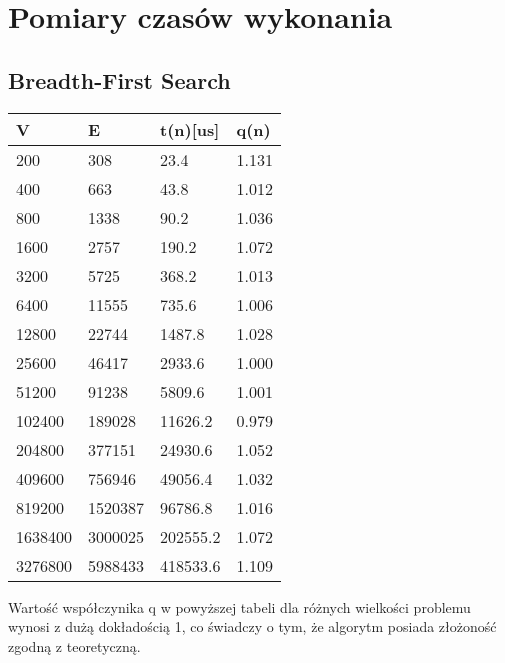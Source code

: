 \documentclass[11pt,a4paper]{article}
\begin{document}
\section{Pomiary czasów wykonania}
\subsection{Breadth-First Search}
\begin{longtable}{| m{1.7cm}| m{1.7cm} | m{1.7cm} | m{1.2cm} |}
\hline
V    &      E    &      t(n)[us] &  q(n)  \\ \hline
200  &      308  &      23.4  &     1.131 \\ \hline
400  &      663  &      43.8  &     1.012 \\ \hline
800  &      1338  &     90.2  &     1.036 \\ \hline
1600  &     2757  &     190.2  &    1.072 \\ \hline
3200  &     5725  &     368.2  &    1.013 \\ \hline
6400  &     11555  &    735.6  &    1.006 \\ \hline
12800  &    22744  &    1487.8  &   1.028 \\ \hline
25600  &    46417  &    2933.6  &   1.000 \\ \hline
51200  &    91238  &    5809.6  &   1.001 \\ \hline
102400  &   189028  &   11626.2  &  0.979 \\ \hline
204800  &   377151  &   24930.6  &  1.052 \\ \hline
409600  &   756946  &   49056.4  &  1.032 \\ \hline
819200  &   1520387  &  96786.8  &  1.016 \\ \hline
1638400  &  3000025  &  202555.2  & 1.072 \\ \hline
3276800  &  5988433  &  418533.6  & 1.109 \\ \hline
\end{longtable}

Wartość współczynika q w powyższej tabeli dla różnych wielkości problemu wynosi z dużą dokładością 1,
co świadczy o tym, że algorytm posiada złożoność zgodną z teoretyczną.
\end{document}

